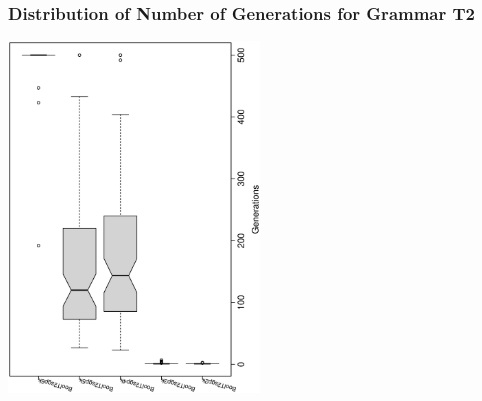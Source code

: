  \begin{frame}
 \frametitle{ Distribution of Number of Generations for Grammar T2 }
 \begin{center}
\includegraphics[width=0.5\textwidth, angle=-90]
{ExpBboxplottGenerations007.eps}
 \end{center}
 \label{ExpBboxplottGenerations007.eps}  
 \end{frame}

